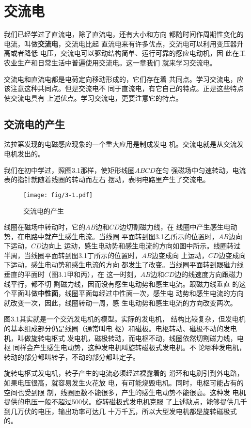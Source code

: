 \chapter{交流电}
我们已经学过了直流电，除了直流电，还有大小和方向
都随时间作周期性变化的电流，叫做\textbf{交流电}，交流电比起
直流电来有许多优点，交流电可以利用变压器升高或者降低
电压，交流电可以驱动结构简单、运行可靠的感应电动机，因
此在工农业生产和日常生活中普遍使用交流电。这一章我们
就来学习交流电。

交流电和直流电都是电荷定向移动形成的，它们存在着
共同点。学习交流电，应该注意这种共同点。但是交流电不
同于直流电，有它自己的特点。正是这些特点使交流电具有
上述优点。学习交流电，更要注意它的特点。

\section{交流电的产生}


法拉第发现的电磁感应现象的一个重大应用是制成发电
机。交流电就是从交流发电机发出的。

我们在初中学过，照图3.1那样，使矩形线圈$ABCD$在匀
强磁场中匀速转动，电流表的指针就随着线圈的转动而左右
摆动，表明电路里产生了交流电。

\begin{figure}[htp]\centering
    \texttt{[image: fig/3-1.pdf]}
    \caption{交流电的产生}
    \end{figure}

线圈在磁场中转动时，它的$AB$边和$CD$边切割磁力线，在
线圈中产生感生电动势，在电路中就产生感生电流。当线圈
平面转到图3.1乙所示的位置时，$AB$边向下运动，$CD$边向上
运动，感生电动势和感生电流的方向如图中所示。线圈转过
半周，当线圈平面转到图3.1丁所示的位置时，$AB$边变成向
上运动，$CD$边变成向下运动，感生电动势和感生电流的方向
都发生了改变。当线圈平面转到跟磁力线垂直的平面时（图3.1甲和丙），在
这一时刻，$AB$边和$CD$边的线速度方向跟磁力线平行，都不切
割磁力线，因而没有感生电动势和感生电流。跟磁力线垂直
的这个平面叫做\textbf{中性面}，线圈平面每经过中性面一次，感生电
动势和感生电流的方向就改变一次，因此，线圈转动一周，感
生电动势和感生电流的方向改变两次。

图3.1其实就是一个交流发电机的模型。实际的发电机，
结构比较复杂，但发电机的基本组成部分仍是线圈（通常叫电
枢）和磁极。电枢转动、磁极不动的发电机，叫做旋转电枢式
发电机，磁极转动，而电枢不动，线圈依然切割磁力线，电枢
同样会产生感生电动势，这种发电机叫旋转磁极式发电机。不
论哪种发电机，转动的部分都叫转子，不动的部分都叫定子。

旋转电枢式发电机，转子产生的电流必须经过裸露着的
滑环和电刷引到外电路，如果电压很高，就容易发生火花放
电，有可能烧毁电机。同时，电枢可能占有的空间也受到限
制，线圈匝数不能很多，产生的感生电动势不能很高。这种发
电机提供的电压一般不超过500伏。旋转磁极式发电机克服
了上述缺点，能够提供几千到几万伏的电压，输出功率可达几
十万千瓦，所以大型发电机都是旋转磁极式的。

